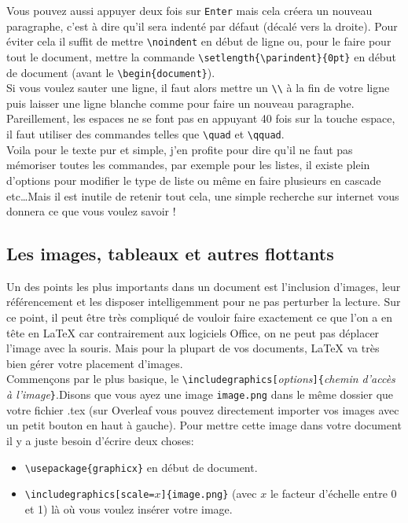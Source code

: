 \documentclass[11pt]{article}				%
\newcommand{\tb}{\textbackslash}
\newcommand{\cmdo}[3][]{\texttt{\textbackslash #2}\texttt{[#1}\texttt{]\{#3\}}}
\newcommand{\cmdoi}[3][]{\texttt{\textbackslash #2}\texttt{[}\textit{#1}\texttt{]\{}\textit{#3}\texttt{\}}}
\newcommand{\cmd}[2]{\texttt{\textbackslash #1}\texttt{\{#2\}}}
\begin{document}
Vous pouvez aussi appuyer deux fois sur \texttt{Enter} mais cela créera un nouveau paragraphe, c'est à dire qu'il sera indenté par défaut (décalé vers la droite). Pour éviter cela il suffit de mettre \texttt{\tb noindent} en début de ligne ou, pour le faire pour tout le document, mettre la commande \texttt{\tb setlength\{\tb parindent\}\{0pt\}} en début de document (avant le \texttt{\tb begin\{document\}}).\\
Si vous voulez sauter une ligne, il faut alors mettre un \texttt{\tb \tb} à la fin de votre ligne puis laisser une ligne blanche comme pour faire un nouveau paragraphe.\\
Pareillement, les espaces ne se font pas en appuyant 40 fois sur la touche espace, il faut utiliser des commandes telles que \texttt{\tb quad} et \texttt{\tb qquad}.\\

Voila pour le texte pur et simple, j'en profite pour dire qu'il ne faut pas mémoriser toutes les commandes, par exemple pour les listes, il existe plein d'options pour modifier le type de liste ou même en faire plusieurs en cascade etc\dots Mais il est inutile de retenir tout cela, une simple recherche sur internet vous donnera ce que vous voulez savoir ! 

\subsection*{Les images, tableaux et autres flottants}

Un des points les plus importants dans un document est l'inclusion d'images, leur référencement et les disposer intelligemment pour ne pas perturber la lecture. Sur ce point, il peut être très compliqué de vouloir faire exactement ce que l'on a en tête en LaTeX car contrairement aux logiciels Office, on ne peut pas déplacer l'image avec la souris.
Mais pour la plupart de vos documents, LaTeX va très bien gérer votre placement d'images.\\

Commençons par le plus basique, le \cmdoi[options]{includegraphics}{\textit{chemin d'accès à l'image}}.Disons que vous ayez une image \texttt{image.png} dans le même dossier que votre fichier .tex (sur Overleaf vous pouvez directement importer vos images avec un petit bouton en haut à gauche). Pour mettre cette image dans votre document il y a juste besoin d'écrire deux choses: \\

\begin{itemize}
	\item \cmd{usepackage}{graphicx} en début de document.
	\item \cmdo[scale=$x$]{includegraphics}{image.png} \quad (avec $x$ le facteur d'échelle entre 0 et 1) là où vous voulez insérer votre image.
\end{itemize}
\end{document}
